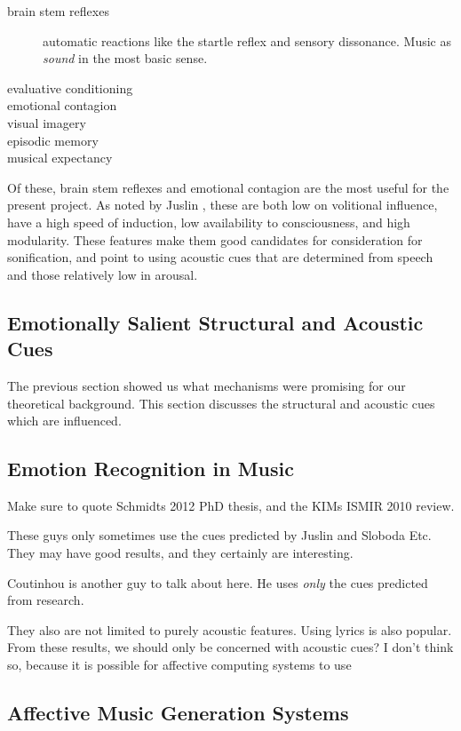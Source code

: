 \begin{description}
\item[brain stem reflexes] automatic reactions like the startle reflex and sensory dissonance.  Music as \textit{sound} in the most basic sense.
\item[evaluative conditioning]
\item[emotional contagion]
\item[visual imagery]
\item[episodic memory]
\item[musical expectancy]
\end{description}

Of these, brain stem reflexes and emotional contagion are the most useful for the present project.  As noted by Juslin \cite[Table. 4]{JuslinBBS:2008}, these are both low on volitional influence, have a high speed of induction, low availability to consciousness, and high modularity.  These features make them good candidates for consideration for sonification, and point to using acoustic cues that are determined from speech and those relatively low in arousal.

\subsection{Emotionally Salient Structural and Acoustic Cues}

The previous section showed us what mechanisms were promising for our theoretical background.  This section discusses the structural and acoustic cues which are influenced.  

\subsection{Emotion Recognition in Music}
Make sure to quote Schmidts 2012 PhD thesis, and the KIMs ISMIR 2010 review. 

These guys only sometimes use the cues predicted by Juslin and Sloboda Etc.  They may have good results, and they certainly are interesting.  

Coutinhou is another guy to talk about here.  He uses \textit{only} the cues predicted from research.

They also are not limited to purely acoustic features.  Using lyrics is also popular.  From these results, we should only be concerned with acoustic cues?  I don't think so, because it is possible for affective computing systems to use 

\subsection{Affective Music Generation Systems}

